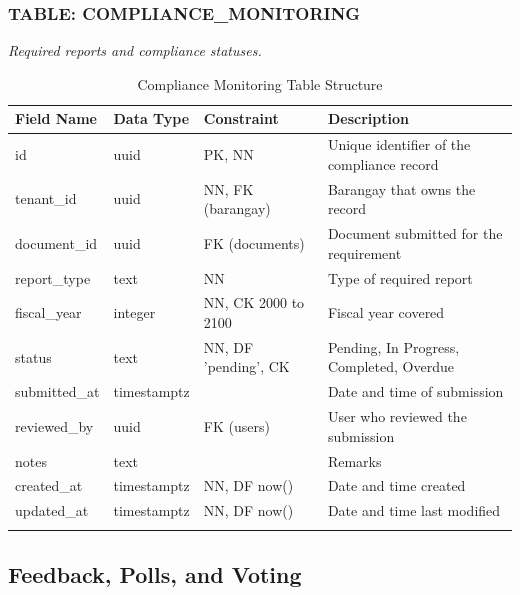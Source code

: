 \subsubsection*{TABLE: COMPLIANCE\_MONITORING}
\noindent\textit{Required reports and compliance statuses.}
\begin{longtable}{|p{3.2cm}|p{2.2cm}|p{3.2cm}|p{5.4cm}|}
\hline
\textbf{Field Name} & \textbf{Data Type} & \textbf{Constraint} & \textbf{Description} \\ \hline
\endhead
\hline \endfoot
\hline \endlastfoot
id & uuid & PK, NN & Unique identifier of the compliance record \\ \hline
tenant\_id & uuid & NN, FK (barangay) & Barangay that owns the record \\ \hline
document\_id & uuid & FK (documents) & Document submitted for the requirement \\ \hline
report\_type & text & NN & Type of required report \\ \hline
fiscal\_year & integer & NN, CK 2000 to 2100 & Fiscal year covered \\ \hline
status & text & NN, DF 'pending', CK & Pending, In Progress, Completed, Overdue \\ \hline
submitted\_at & timestamptz & & Date and time of submission \\ \hline
reviewed\_by & uuid & FK (users) & User who reviewed the submission \\ \hline
notes & text & & Remarks \\ \hline
created\_at & timestamptz & NN, DF now() & Date and time created \\ \hline
updated\_at & timestamptz & NN, DF now() & Date and time last modified \\ \hline
\caption{Compliance Monitoring Table Structure}
\label{tab:compliance_monitoring}
\end{longtable}

\subsection{Feedback, Polls, and Voting}

